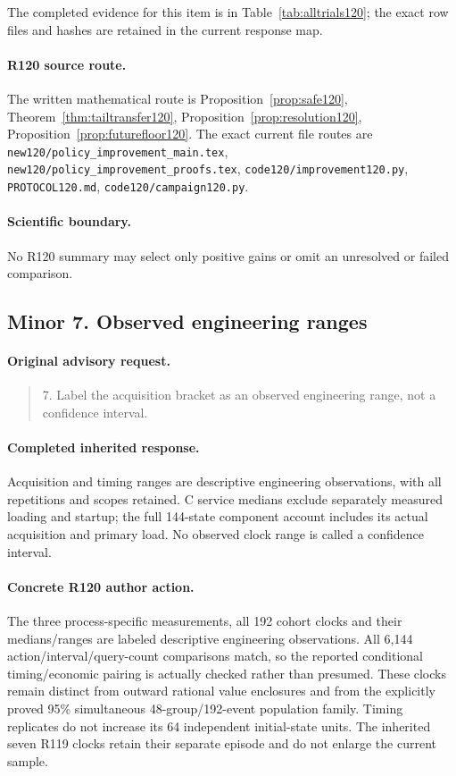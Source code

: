 The completed evidence for this item is in Table~\ref{tab:alltrials120}; the exact row files and hashes are retained in the current response map.
\paragraph{R120 source route.}
The written mathematical route is Proposition~\ref{prop:safe120}, Theorem~\ref{thm:tailtransfer120}, Proposition~\ref{prop:resolution120}, Proposition~\ref{prop:futurefloor120}. The exact current file routes are \nolinkurl{new120/policy_improvement_main.tex}, \nolinkurl{new120/policy_improvement_proofs.tex}, \nolinkurl{code120/improvement120.py}, \nolinkurl{PROTOCOL120.md}, \nolinkurl{code120/campaign120.py}.
\paragraph{Scientific boundary.}
No R120 summary may select only positive gains or omit an unresolved or failed comparison.

\subsection{Minor 7. Observed engineering ranges}
\label{response120:minor-7}
\paragraph{Original advisory request.}
\begin{quote}
7. Label the acquisition bracket as an observed engineering range, not a confidence interval.
\end{quote}
\paragraph{Completed inherited response.}
Acquisition and timing ranges are descriptive engineering observations, with all repetitions and scopes retained. C service medians exclude separately measured loading and startup; the full 144-state component account includes its actual acquisition and primary load. No observed clock range is called a confidence interval.
\paragraph{Concrete R120 author action.}
The three process-specific measurements, all 192 cohort clocks and their medians/ranges are labeled descriptive engineering observations. All 6,144 action/interval/query-count comparisons match, so the reported conditional timing/economic pairing is actually checked rather than presumed. These clocks remain distinct from outward rational value enclosures and from the explicitly proved 95\% simultaneous 48-group/192-event population family. Timing replicates do not increase its 64 independent initial-state units. The inherited seven R119 clocks retain their separate episode and do not enlarge the current sample.

